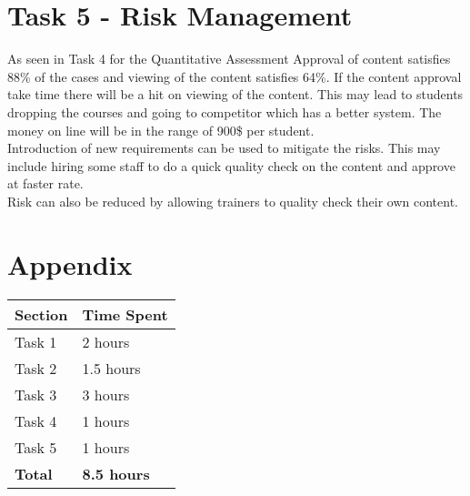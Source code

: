 \documentclass{article}
\begin{document}
\section{Task 5 - Risk Management}
As seen in Task 4 for the Quantitative Assessment Approval of content satisfies 88\% of the cases and viewing of the content satisfies 64\%. If the content approval take time there will be a hit on viewing of the content. This may lead to students dropping the courses and going to competitor which has a better system. The money on line will be in the range of 900\$ per student.\\

Introduction of new requirements can be used to mitigate the risks. This may include hiring some staff to do a quick quality check on the content and approve at faster rate.\\

Risk can also be reduced by allowing trainers to quality check their own content.\\

\section{Appendix}
\begin{tabular}{|p{5.5cm}|p{6.5cm}|}
\hline
\textbf{Section} & \textbf{Time Spent} \\ \hline
Task 1 & 2 hours \\ \hline
Task 2 & 1.5 hours \\ \hline
Task 3 & 3 hours \\ \hline
Task 4 & 1 hours \\ \hline
Task 5 & 1 hours \\ \hline
\textbf{Total} & \textbf{8.5 hours} \\ \hline
\end{tabular}
\end{document}
